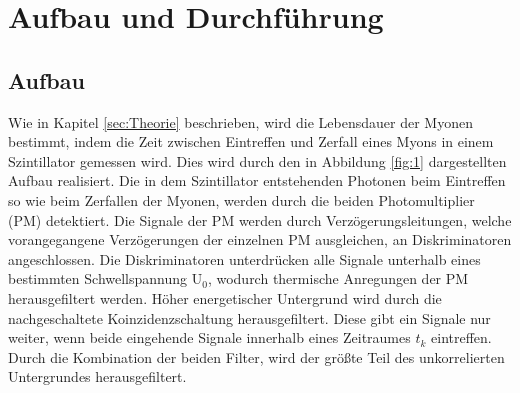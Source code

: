 
\section{Aufbau und Durchführung}
\label{sec:Durchführung}

\subsection{Aufbau}
Wie in Kapitel \ref{sec:Theorie} beschrieben, wird die Lebensdauer der Myonen bestimmt, indem die Zeit zwischen Eintreffen und Zerfall eines Myons in einem Szintillator gemessen wird.
Dies wird durch den in Abbildung \ref{fig:1} dargestellten Aufbau realisiert.
Die in dem Szintillator entstehenden Photonen beim Eintreffen so wie beim Zerfallen der Myonen, werden durch die beiden Photomultiplier (PM) detektiert.
Die Signale der PM werden durch Verzögerungsleitungen, welche vorangegangene Verzögerungen der einzelnen PM ausgleichen, an Diskriminatoren angeschlossen.
Die Diskriminatoren unterdrücken alle Signale unterhalb eines bestimmten Schwellspannung U$_0$, wodurch thermische Anregungen der PM herausgefiltert werden.
Höher energetischer Untergrund wird durch die nachgeschaltete Koinzidenzschaltung herausgefiltert.
Diese gibt ein Signale nur weiter, wenn beide eingehende Signale innerhalb eines Zeitraumes $t_k$ eintreffen.
Durch die Kombination der beiden Filter, wird der größte Teil des unkorrelierten Untergrundes herausgefiltert.

